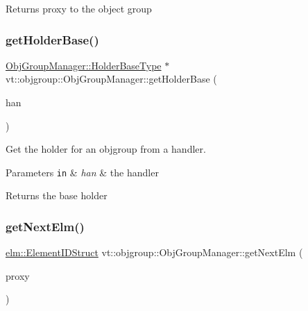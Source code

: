 \begin{DoxyReturn}{Returns}
proxy to the object group 
\end{DoxyReturn}
\mbox{\label{structvt_1_1objgroup_1_1_obj_group_manager_a5e471b3448e27e86697dcbb00e053230}} 
\subsubsection{\texorpdfstring{get\+Holder\+Base()}{getHolderBase()}}
{\footnotesize\ttfamily \hyperlink{structvt_1_1objgroup_1_1_obj_group_manager_a4898fc9cabf44890e5593f8c4ab86230}{Obj\+Group\+Manager\+::\+Holder\+Base\+Type} $\ast$ vt\+::objgroup\+::\+Obj\+Group\+Manager\+::get\+Holder\+Base (\begin{DoxyParamCaption}\item[{\hyperlink{namespacevt_af64846b57dfcaf104da3ef6967917573}{Handler\+Type}}]{han }\end{DoxyParamCaption})\hspace{0.3cm}{\ttfamily [private]}}



Get the holder for an objgroup from a handler. 


\begin{DoxyParams}[1]{Parameters}
\mbox{\tt in}  & {\em han} & the handler\\
\hline
\end{DoxyParams}
\begin{DoxyReturn}{Returns}
the base holder 
\end{DoxyReturn}
\mbox{\label{structvt_1_1objgroup_1_1_obj_group_manager_a0ebea4ad5b94becdeefe688d75f78142}} 
\subsubsection{\texorpdfstring{get\+Next\+Elm()}{getNextElm()}}
{\footnotesize\ttfamily \hyperlink{structvt_1_1elm_1_1_element_i_d_struct}{elm\+::\+Element\+I\+D\+Struct} vt\+::objgroup\+::\+Obj\+Group\+Manager\+::get\+Next\+Elm (\begin{DoxyParamCaption}\item[{\hyperlink{namespacevt_ad7cae989df485fccca57f0792a880a8e}{Obj\+Group\+Proxy\+Type}}]{proxy }\end{DoxyParamCaption})\hspace{0.3cm}{\ttfamily [private]}}



